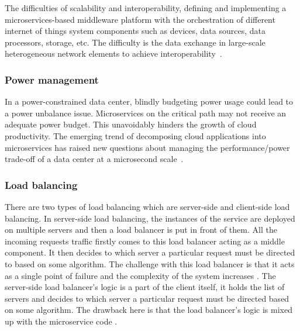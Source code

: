 \par The difficulties of scalability and interoperability, defining and implementing a microservices-based middleware platform with the orchestration of different internet of things system components such as devices, data sources, data processors, storage, etc. The difficulty is the data exchange in large-scale heterogeneous network elements to achieve interoperability~\cite{Fred2015}.

\subsubsection{Power management}%

In a power-constrained data center, blindly budgeting power usage could lead to a power unbalance issue. Microservices on the critical path may not receive an adequate power budget. This unavoidably hinders the growth of cloud productivity. The emerging trend of decomposing cloud applications into microservices has raised new questions about managing the performance/power trade-off of a data center at a microsecond scale~\cite{Hou2020}.

\subsubsection{Load balancing}%


There are two types of load balancing which are server-side and client-side load balancing. In server-side load balancing, the instances of the service are deployed on multiple servers and then a load balancer is put in front of them. All the incoming requests traffic firstly comes to this load balancer acting as a middle component. It then decides to which server a particular request must be directed to based on some algorithm. The challenge with this load balancer is that it acts as a single point of failure and the complexity of the system increases \cite{Ville2019}. The server-side load balancer's logic is a part of the client itself, it holds the list of servers and decides to which server a particular request must be directed based on some algorithm. The drawback here is that the load balancer's logic is mixed up with the microservice code \cite{Branko2018}.


